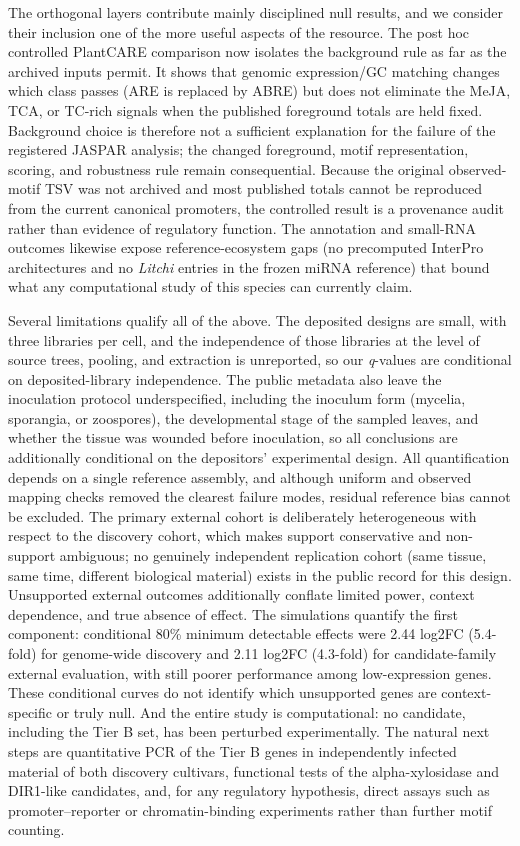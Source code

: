 \documentclass[11pt]{article}
\newcommand{\q}{\textit{q}}
\begin{document}
The orthogonal layers contribute mainly disciplined null results, and we consider their inclusion one of the more useful aspects of the resource. The post hoc controlled PlantCARE comparison now isolates the background rule as far as the archived inputs permit. It shows that genomic expression/GC matching changes which class passes (ARE is replaced by ABRE) but does not eliminate the MeJA, TCA, or TC-rich signals when the published foreground totals are held fixed. Background choice is therefore not a sufficient explanation for the failure of the registered JASPAR analysis; the changed foreground, motif representation, scoring, and robustness rule remain consequential. Because the original observed-motif TSV was not archived and most published totals cannot be reproduced from the current canonical promoters, the controlled result is a provenance audit rather than evidence of regulatory function. The annotation and small-RNA outcomes likewise expose reference-ecosystem gaps (no precomputed InterPro architectures and no \textit{Litchi} entries in the frozen miRNA reference) that bound what any computational study of this species can currently claim.

Several limitations qualify all of the above. The deposited designs are small, with three libraries per cell, and the independence of those libraries at the level of source trees, pooling, and extraction is unreported, so our \q-values are conditional on deposited-library independence. The public metadata also leave the inoculation protocol underspecified, including the inoculum form (mycelia, sporangia, or zoospores), the developmental stage of the sampled leaves, and whether the tissue was wounded before inoculation, so all conclusions are additionally conditional on the depositors' experimental design. All quantification depends on a single reference assembly, and although uniform and observed mapping checks removed the clearest failure modes, residual reference bias cannot be excluded. The primary external cohort is deliberately heterogeneous with respect to the discovery cohort, which makes support conservative and non-support ambiguous; no genuinely independent replication cohort (same tissue, same time, different biological material) exists in the public record for this design. Unsupported external outcomes additionally conflate limited power, context dependence, and true absence of effect. The simulations quantify the first component: conditional 80\% minimum detectable effects were 2.44 log2FC (5.4-fold) for genome-wide discovery and 2.11 log2FC (4.3-fold) for candidate-family external evaluation, with still poorer performance among low-expression genes. These conditional curves do not identify which unsupported genes are context-specific or truly null. And the entire study is computational: no candidate, including the Tier B set, has been perturbed experimentally. The natural next steps are quantitative PCR of the Tier B genes in independently infected material of both discovery cultivars, functional tests of the alpha-xylosidase and DIR1-like candidates, and, for any regulatory hypothesis, direct assays such as promoter--reporter or chromatin-binding experiments rather than further motif counting.
\end{document}
